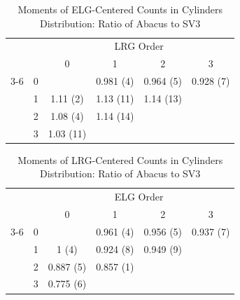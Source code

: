 \documentclass[fleqn,usenatbib]{mnras}
\begin{document}
    \begin{table}
    \caption{Moments of ELG-Centered Counts in Cylinders Distribution: Ratio of Abacus to SV3}
    \begin{tabular}{ c  c  c  c c c}
    \multicolumn{2}{c}{}&\multicolumn{4}{c}{LRG Order}\\
     \multicolumn{1}{c}{}& &  0&1&  2 &3\\ \cline{3-6}
    
    \multirow[|l|]{4}{*}{\rotatebox[origin=c]{90}{ELG Order}}& \multicolumn{1}{c|}{0} && 0.981 (4) & 0.964 (5)&0.928 (7)\\
     & \multicolumn{1}{c|}{1} &1.11 (2)&1.13 (11)&1.14 (13)&\multicolumn{1}{c}{}\\
    
     &\multicolumn{1}{c|}{2} & 1.08 (4)&1.14 (14)& \multicolumn{2}{c}{}\\
     &\multicolumn{1}{c|}{3} &1.03 (11)& \multicolumn{2}{c}{}\\
    
    \end{tabular}
    
    \end{table}

    \begin{table}
    \caption{Moments of LRG-Centered Counts in Cylinders Distribution: Ratio of Abacus to SV3}
    \begin{tabular}{ c  c  c  c c c}
    \multicolumn{2}{c}{}&\multicolumn{4}{c}{ELG Order}\\
     \multicolumn{1}{c}{}& &  0&1&  2 &3\\ \cline{3-6}
    
    \multirow[|l|]{4}{*}{\rotatebox[origin=c]{90}{LRG Order}}& \multicolumn{1}{c|}{0} && 0.961 (4) & 0.956 (5)&0.937 (7)\\
     & \multicolumn{1}{c|}{1} &1 (4)&0.924 (8)&0.949 (9)&\multicolumn{1}{c}{}\\
    
     &\multicolumn{1}{c|}{2} & 0.887 (5)&0.857 (1)& \multicolumn{2}{c}{}\\
     &\multicolumn{1}{c|}{3} &0.775 (6)& \multicolumn{2}{c}{}\\
    
    \end{tabular}
    
    \end{table}
\end{document}
